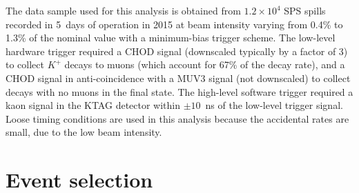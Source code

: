 \documentclass[11pt]{article}
\begin{document}
The data sample used for this analysis is obtained from $1.2\times 10^4$ SPS spills recorded in 5~days of operation in 2015 at beam intensity varying from 0.4\% to 1.3\% of the nominal value with a minimum-bias trigger scheme. The low-level hardware trigger required a CHOD signal (downscaled typically by a factor of 3) to collect $K^+$ decays to muons (which account for 67\% of the decay rate), and a CHOD signal in anti-coincidence with a MUV3 signal (not downscaled) to collect decays with no muons in the final state. The high-level software trigger required a kaon signal in the KTAG detector within $\pm10$~ns of the low-level trigger signal. Loose timing conditions are used in this analysis because the accidental rates are small, due to the low beam intensity.

\section{Event selection}
\label{sec:selection}

\end{document}
